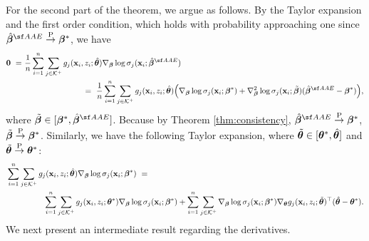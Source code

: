 {For the second part of the theorem, we argue as follows. 
By the Taylor expansion and the first order condition, which holds with probability approaching one since $\hat{\betavec}^{\sf AAE} \stackrel{\text{P}}{\rightarrow}{\betavec}^*$, we have 
\begin{align}
\label{eqn:taylor-1}
    \Ovec ~=&~ \frac{1}{n}\sum_{i=1}^n\sum_{j\in \Kscr^+}g_j(\x_i, z_i; \hat{\thetavec})\nabla_{\betavec}\log \sigma_j(\x_i; \hat{\betavec}^{\sf AAE})\\
    &~~~~~~~~~~~~~~~~~~~~~~~=~\frac{1}{n}\sum_{i=1}^n\sum_{j\in \Kscr^+}g_j(\x_i, z_i; \hat{\thetavec})\Big(\nabla_{\betavec}\log \sigma_j(\x_i; {\betavec}^*) + \nabla^2_{\betavec}\log \sigma_j(\x_i; \tilde{\betavec})(\hat{\betavec}^{\sf AAE} - \betavec^*)\Big),\nonumber
\end{align}
where $\tilde{\betavec} \in [\betavec^*, \hat{\betavec}^{\sf AAE}]$.
Because by Theorem \ref{thm:consistency}, $\hat{\betavec}^{\sf AAE} \pconverge \betavec^*$, 
$\tilde{\bm{\beta}} \overset{\text{\upshape{P}}}{\rightarrow} \bm{\beta}^*$.
Similarly, we have the following Taylor expansion, 
where $\tilde{\bm{\theta}} \in [{\bm{\theta}}^*, \hat{\bm{\theta}}]$ and  $\tilde{\bm{\theta}}\overset{\text{\upshape{P}}}{\rightarrow} \bm{\theta}^*$: 
\begin{align}
\label{eqn:Taylor-2}
    & \sum_{i=1}^n\sum_{j\in \mathcal{K}^+}g_j(\mathbf{x}_i, z_i; \hat{\bm{\theta}})\nabla_{\bm{\beta}}\log \sigma_j(\mathbf{x}_i; {\bm{\beta}}^*) ~=~\\ 
     & ~~~~~~~~~~~~~~\sum_{i=1}^n\sum_{j\in \mathcal{K}^+}g_j(\mathbf{x}_i, z_i; {\bm{\theta}}^*)\nabla_{\bm{\beta}}\log \sigma_j(\mathbf{x}_i; {\bm{\beta}}^*) + \sum_{i=1}^n\sum_{j\in \mathcal{K}^+}\nabla_{\bm{\beta}}\log \sigma_j(\mathbf{x}_i; {\bm{\beta}}^*) \nabla_{\bm{\theta}}g_j(\mathbf{x}_i, z_i; \tilde{\bm{\theta}})^{\top}
      (\hat{\bm{\theta}} - \bm{\theta}^*).\nonumber
\end{align}
We next present an intermediate result regarding the derivatives.

}
